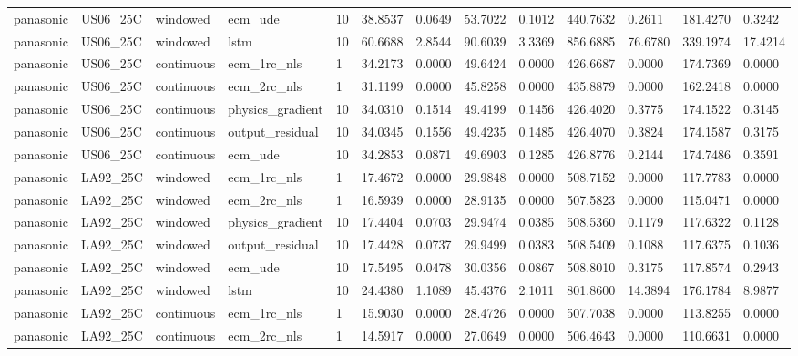 \begin{tabular}{lllllllllllll}
panasonic & US06\_25C & windowed & ecm\_ude & 10 & 38.8537 & 0.0649 & 53.7022 & 0.1012 & 440.7632 & 0.2611 & 181.4270 & 0.3242 \\
panasonic & US06\_25C & windowed & lstm & 10 & 60.6688 & 2.8544 & 90.6039 & 3.3369 & 856.6885 & 76.6780 & 339.1974 & 17.4214 \\
panasonic & US06\_25C & continuous & ecm\_1rc\_nls & 1 & 34.2173 & 0.0000 & 49.6424 & 0.0000 & 426.6687 & 0.0000 & 174.7369 & 0.0000 \\
panasonic & US06\_25C & continuous & ecm\_2rc\_nls & 1 & 31.1199 & 0.0000 & 45.8258 & 0.0000 & 435.8879 & 0.0000 & 162.2418 & 0.0000 \\
panasonic & US06\_25C & continuous & physics\_gradient & 10 & 34.0310 & 0.1514 & 49.4199 & 0.1456 & 426.4020 & 0.3775 & 174.1522 & 0.3145 \\
panasonic & US06\_25C & continuous & output\_residual & 10 & 34.0345 & 0.1556 & 49.4235 & 0.1485 & 426.4070 & 0.3824 & 174.1587 & 0.3175 \\
panasonic & US06\_25C & continuous & ecm\_ude & 10 & 34.2853 & 0.0871 & 49.6903 & 0.1285 & 426.8776 & 0.2144 & 174.7486 & 0.3591 \\
panasonic & LA92\_25C & windowed & ecm\_1rc\_nls & 1 & 17.4672 & 0.0000 & 29.9848 & 0.0000 & 508.7152 & 0.0000 & 117.7783 & 0.0000 \\
panasonic & LA92\_25C & windowed & ecm\_2rc\_nls & 1 & 16.5939 & 0.0000 & 28.9135 & 0.0000 & 507.5823 & 0.0000 & 115.0471 & 0.0000 \\
panasonic & LA92\_25C & windowed & physics\_gradient & 10 & 17.4404 & 0.0703 & 29.9474 & 0.0385 & 508.5360 & 0.1179 & 117.6322 & 0.1128 \\
panasonic & LA92\_25C & windowed & output\_residual & 10 & 17.4428 & 0.0737 & 29.9499 & 0.0383 & 508.5409 & 0.1088 & 117.6375 & 0.1036 \\
panasonic & LA92\_25C & windowed & ecm\_ude & 10 & 17.5495 & 0.0478 & 30.0356 & 0.0867 & 508.8010 & 0.3175 & 117.8574 & 0.2943 \\
panasonic & LA92\_25C & windowed & lstm & 10 & 24.4380 & 1.1089 & 45.4376 & 2.1011 & 801.8600 & 14.3894 & 176.1784 & 8.9877 \\
panasonic & LA92\_25C & continuous & ecm\_1rc\_nls & 1 & 15.9030 & 0.0000 & 28.4726 & 0.0000 & 507.7038 & 0.0000 & 113.8255 & 0.0000 \\
panasonic & LA92\_25C & continuous & ecm\_2rc\_nls & 1 & 14.5917 & 0.0000 & 27.0649 & 0.0000 & 506.4643 & 0.0000 & 110.6631 & 0.0000 \\

\end{tabular}
